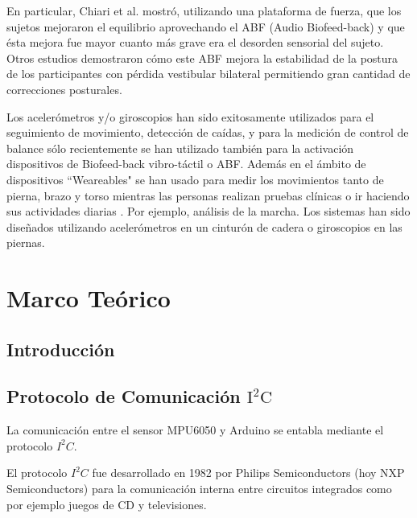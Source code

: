 \documentclass[12pt,a4paper]{article}
\begin{document}
En particular, Chiari et al. mostró, utilizando una plataforma de fuerza, que los sujetos mejoraron el equilibrio aprovechando el ABF (Audio Biofeed-back) y que ésta mejora fue mayor cuanto más grave era el desorden sensorial del sujeto. Otros estudios demostraron cómo este ABF \cite{giansanti_energetic_2009} mejora la estabilidad de la postura de los participantes con pérdida vestibular bilateral permitiendo gran cantidad de correcciones posturales.

Los acelerómetros y/o giroscopios han sido exitosamente utilizados \cite{mancini_relevance_2010} para el seguimiento de movimiento,  detección de caídas, y para la medición de control de balance sólo recientemente se han utilizado también para la activación dispositivos de Biofeed-back vibro-táctil o ABF. Además en el ámbito de dispositivos ``Weareables" se han usado para medir los movimientos tanto de pierna, brazo y torso mientras las personas realizan pruebas clínicas o ir haciendo sus actividades diarias \cite{mancini_relevance_2010}. Por ejemplo, análisis de la marcha.
Los sistemas han sido diseñados utilizando acelerómetros en un cinturón de cadera o giroscopios en las piernas.



\section{Marco Teórico}

\subsection{Introducción}

\subsection{Protocolo de Comunicación $\mathbf{\mathrm{I^2C}}$}
La comunicación entre el sensor MPU6050 y Arduino se entabla mediante el protocolo $I^2C$.

El protocolo $I^2C$ fue desarrollado en 1982 por Philips Semiconductors (hoy NXP Semiconductors) para la comunicación interna entre circuitos integrados como por ejemplo juegos de CD y televisiones.
\end{document}
